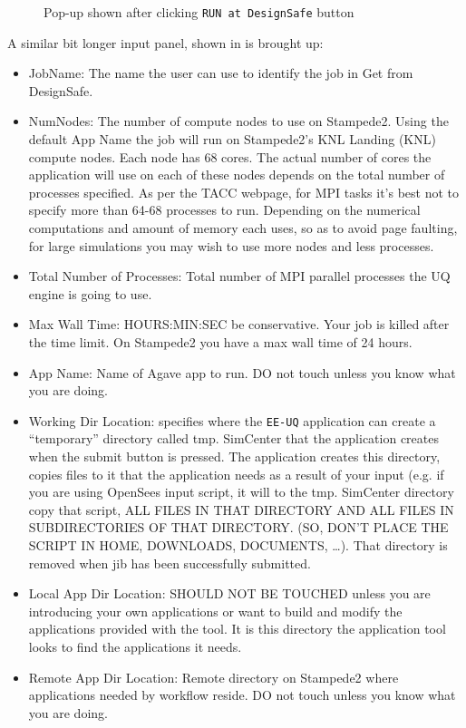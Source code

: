\begin{figure}[!htbp]
  \caption{Pop-up shown after clicking \texttt{RUN at DesignSafe} button}
  \label{fig:remote_button}
\end{figure}

A similar bit longer input panel, shown in 
is brought up:
\begin{itemize}
\item JobName: The name the user can use to identify the job in Get from DesignSafe.
\item NumNodes: The number of compute nodes to use on Stampede2. Using the default App Name the job will run on Stampede2’s KNL Landing (KNL) 
compute nodes. Each node has 68 cores. The actual number of cores the
application will use on each of these nodes depends on the total
number of processes specified. As per the TACC webpage, for MPI tasks
it’s best not to specify more than 64-68 processes to run. Depending
on the numerical computations and amount of memory each uses, so as to
avoid page faulting, for large simulations you may wish to use more
nodes and less processes.
\item Total Number of Processes: Total number of MPI parallel processes the UQ engine is going to use.
\item Max Wall Time:  HOURS:MIN:SEC be conservative. Your job is killed after the time limit. On Stampede2 you have a max wall time of 24 hours.
\item App Name:   Name of Agave app to run. DO not touch unless you know what you are doing.
\item Working Dir Location: specifies where the \texttt{EE-UQ} application can create a “temporary” directory called tmp. SimCenter that the application 
creates when the submit button is pressed. The application creates
this directory, copies files to it that the application needs as a
result of your input (e.g. if you are using OpenSees input script, it
will to the tmp. SimCenter directory copy that script, ALL FILES IN
THAT DIRECTORY AND ALL FILES IN SUBDIRECTORIES OF THAT DIRECTORY. (SO,
DON’T PLACE THE SCRIPT IN HOME, DOWNLOADS, DOCUMENTS, …). That
directory is removed when jib has been successfully submitted.
\item Local App Dir Location: SHOULD NOT BE TOUCHED unless you are introducing your own applications or want to build and modify the applications 
provided with the tool. It is this directory the application tool
looks to find the applications it needs.
\item Remote App Dir Location: Remote directory on Stampede2 where applications needed by workflow reside. DO not touch unless you know what you are doing.

\end{itemize}

